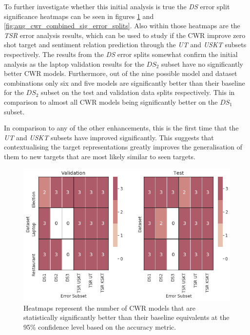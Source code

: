 To further investigate whether this initial analysis is true the \textit{DS} error split significance heatmaps can be seen in figures \ref{fig:aug_cwr_dataset_sig_error_splits} and \ref{fig:aug_cwr_combined_sig_error_splits}. Also within those heatmaps are the \textit{TSR} error analysis results, which can be used to study if the CWR improve zero shot target and sentiment relation prediction through the \textit{UT} and \textit{USKT} subsets respectively. The results from the \textit{DS} error splits somewhat confirm the initial analysis as the laptop validation results for the $DS_2$ subset have no significantly better CWR models. Furthermore, out of the nine possible model and dataset combinations only six and five models are significantly better than their baseline for the $DS_2$ subset on the test and validation data splits respectively. This in comparison to almost all CWR models being significantly better on the $DS_1$ subset. 

In comparison to any of the other enhancements, this is the first time that the \textit{UT} and \textit{USKT} subsets have improved significantly. This suggests that contextualising the target representations greatly improves the generalisation of them to new targets that are most likely similar to seen targets.

\begin{figure}[!h]
    \centering
    \includegraphics[scale=0.6]{images/augmentation/methods_performance/CWR/cwr_dataset_sig_error_splits.png}
    \caption{Heatmaps represent the number of CWR models that are statistically significantly better than their baseline equivalents at the 95\% confidence level based on the accuracy metric.}
    \label{fig:aug_cwr_dataset_sig_error_splits}
\end{figure}

